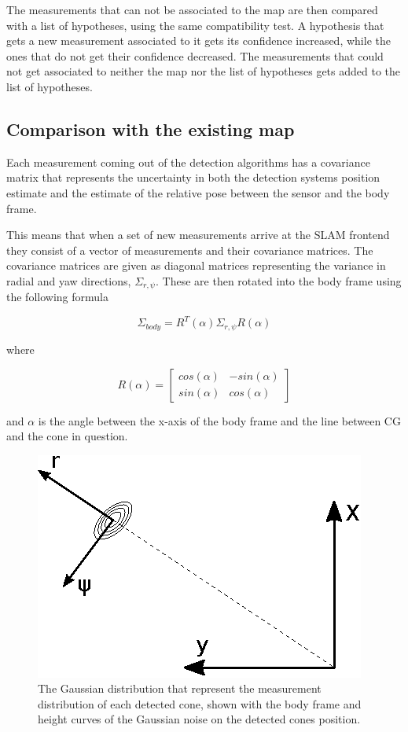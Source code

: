 The measurements that can not be associated to the map are then compared with a list of hypotheses, using the same compatibility test. A hypothesis that gets a new measurement associated to it gets its confidence increased, while the ones that do not get their confidence decreased. The measurements that could not get associated to neither the map nor the list of hypotheses gets added to the list of hypotheses. 

\subsection{Comparison with the existing map}

Each measurement coming out of the detection algorithms has a covariance matrix that represents the uncertainty in both the detection systems position estimate and the estimate of the relative pose between the sensor and the body frame.

This means that when a set of new measurements arrive at the \gls{SLAM} frontend they consist of a vector of measurements and their covariance matrices. The covariance matrices are given as diagonal matrices representing the variance in radial and yaw directions, $\Sigma_{r,\psi}$. These are then rotated into the body frame using the following formula

\begin{equation}
    \Sigma_{body} = R^T(\alpha)\Sigma_{r,\psi}R(\alpha)
    \label{DetectToBodyRot}
\end{equation}

where 

\begin{equation}
    R(\alpha) = \begin{bmatrix} cos(\alpha) & -sin(\alpha) \\ sin(\alpha) & cos(\alpha)
    \end{bmatrix}
\end{equation} 

and $\alpha$ is the angle between the x-axis of the body frame and the line between \gls{CG} and the cone in question. 

\begin{figure}
    \centering
    \includegraphics[width=0.5\linewidth]{0_Images/3_Theory/DetectionFrame.eps}
    \caption[The Gaussian distribution that represent the measurement distribution of each detected cone.]{The Gaussian distribution that represent the measurement distribution of each detected cone, shown with the body frame and height curves of the Gaussian noise on the detected cones position.}
    \label{Fig:DetectionFrame}
\end{figure}

